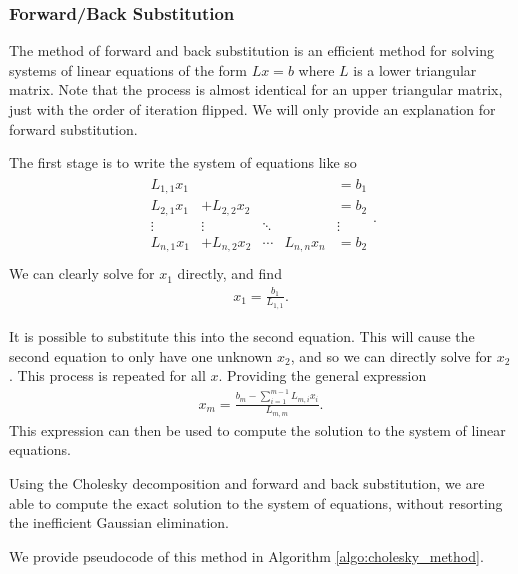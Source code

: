 \documentclass[../fem.tex]{subfile}
\begin{document}
\subsubsection{Forward/Back Substitution}%
\label{ssub:forward_back_substitution}

The method of forward and back substitution is an efficient method for solving
systems of linear equations of the form $Lx=b$ where $L$ is a lower triangular
matrix. Note that the process is almost identical for an upper triangular
matrix, just with the order of iteration flipped. We will only provide an
explanation for forward substitution.

The first stage is to write the system of equations like so
\begin{align*}
  \begin{matrix}
    L_{1,1}x_1 & & & & =b_1\\
    L_{2,1}x_1 & +L_{2,2}x_2 & & & =b_2\\
    \vdots & \vdots & \ddots & & \vdots\\
    L_{n,1}x_1 & +L_{n,2}x_2 & \cdots & L_{n,n}x_n & =b_2\\
  \end{matrix}.
\end{align*}
We can clearly solve for $x_1$ directly, and find
\begin{align*}
  x_1=\frac{b_1}{L_{1,1}}.
\end{align*}

It is possible to substitute this into the second equation. This will cause the
second equation to only have one unknown $x_2$, and so we can directly solve
for $x_2$. This process is repeated for all $x$. Providing the general
expression
\begin{align*}
  x_m=\frac{b_m-\sum_{i=1}^{m-1}L_{m,i}x_i}{L_{m,m}}.
\end{align*}
This expression can then be used to compute the solution to the system of
linear equations.

Using the Cholesky decomposition and forward and back substitution, we are able
to compute the exact solution to the system of equations, without resorting the
inefficient Gaussian elimination.

We provide pseudocode of this method in Algorithm \ref{algo:cholesky_method}.
\end{document}
